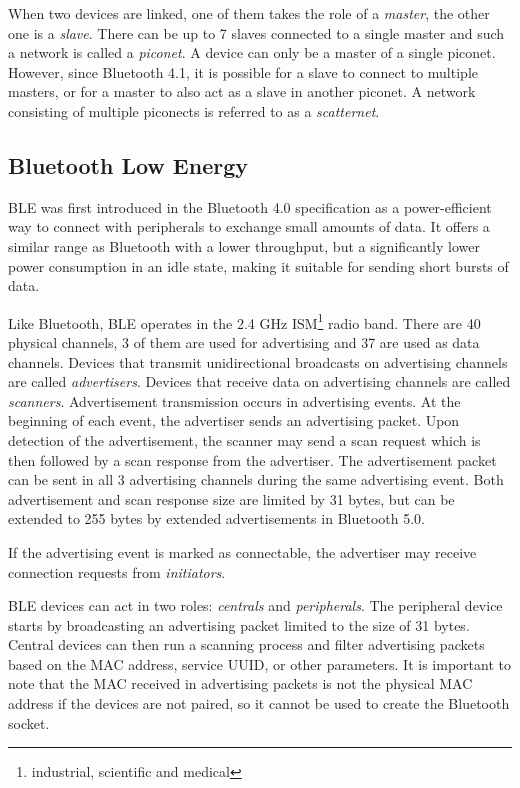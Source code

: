 \documentclass[conference,compsoc]{IEEEtran}
\begin{document}
When two devices are linked, one of them takes the role of a \textit{master}, the other one is a \textit{slave}. There can be up to 7 slaves connected to a single master and such a network is called a \textit{piconet}. A device can only be a master of a single piconet. However, since Bluetooth 4.1, it is possible for a slave to connect to multiple masters, or for a master to also act as a slave in another piconet. A network consisting of multiple piconects is referred to as a \textit{scatternet}. \cite{bluetooth51spec}

\subsection{Bluetooth Low Energy}
BLE was first introduced in the Bluetooth 4.0 specification as a power-efficient way to connect with peripherals to exchange small amounts of data. It offers a similar range as Bluetooth with a lower throughput, but a significantly lower power consumption in an idle state, making it suitable for sending short bursts of data.

Like Bluetooth, BLE operates in the 2.4 GHz ISM\footnote{industrial, scientific and medical} radio band. There are 40 physical channels, 3 of them are used for advertising and 37 are used as data channels. Devices that transmit unidirectional broadcasts on advertising channels are called \textit{advertisers}. Devices that receive data on advertising channels are called \textit{scanners}. Advertisement transmission occurs in advertising events. At the beginning of each event, the advertiser sends an advertising packet. Upon detection of the advertisement, the scanner may send a scan request which is then followed by a scan response from the advertiser. The advertisement packet can be sent in all 3 advertising channels during the same advertising event. Both advertisement and scan response size are limited by 31 bytes, but can be extended to 255 bytes by extended advertisements in Bluetooth 5.0. \cite{bluetooth51spec}

If the advertising event is marked as connectable, the advertiser may receive connection requests from \textit{initiators}. 

BLE devices can act in two roles: \textit{centrals} and \textit{peripherals}. The peripheral device starts by broadcasting an advertising packet limited to the size of 31 bytes. Central devices can then run a scanning process and filter advertising packets based on the MAC address, service UUID, or other parameters. It is important to note that the MAC received in advertising packets is not the physical MAC address if the devices are not paired, so it cannot be used to create the Bluetooth socket. \cite{ble:privacy} 
\end{document}
